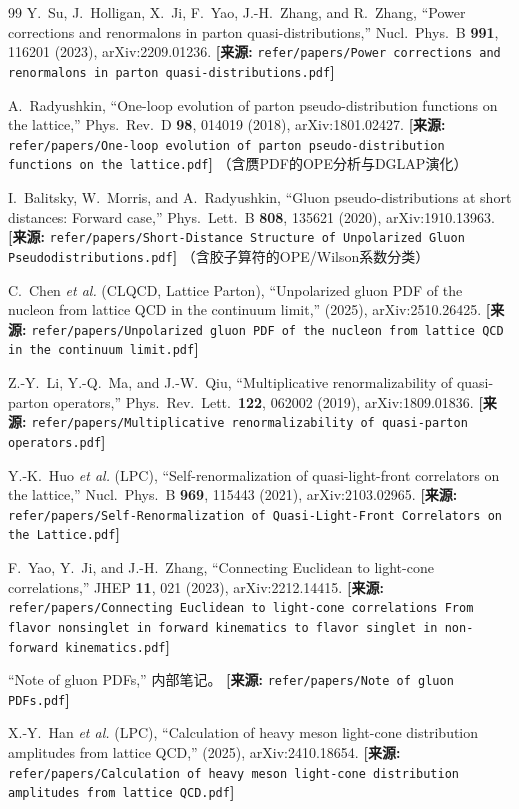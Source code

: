 \documentclass[12pt,a4paper]{ctexart}
\theoremstyle{definition}
\begin{document}
\begin{thebibliography}{99}
Y.~Su, J.~Holligan, X.~Ji, F.~Yao, J.-H.~Zhang, and R.~Zhang,
``Power corrections and renormalons in parton quasi-distributions,''
Nucl.\ Phys.\ B \textbf{991}, 116201 (2023), arXiv:2209.01236.
\quad\textbf{[来源:} \texttt{refer/papers/Power corrections and renormalons in parton quasi-distributions.pdf}\textbf{]}

A.~Radyushkin,
``One-loop evolution of parton pseudo-distribution functions on the lattice,''
Phys.\ Rev.\ D \textbf{98}, 014019 (2018), arXiv:1801.02427.
\quad\textbf{[来源:} \texttt{refer/papers/One-loop evolution of parton pseudo-distribution functions on the lattice.pdf}\textbf{]}
（含赝PDF的OPE分析与DGLAP演化）

I.~Balitsky, W.~Morris, and A.~Radyushkin,
``Gluon pseudo-distributions at short distances: Forward case,''
Phys.\ Lett.\ B \textbf{808}, 135621 (2020), arXiv:1910.13963.
\quad\textbf{[来源:} \texttt{refer/papers/Short-Distance Structure of Unpolarized Gluon Pseudodistributions.pdf}\textbf{]}
（含胶子算符的OPE/Wilson系数分类）

C.~Chen \textit{et al.} (CLQCD, Lattice Parton),
``Unpolarized gluon PDF of the nucleon from lattice QCD in the continuum limit,''
(2025), arXiv:2510.26425.
\quad\textbf{[来源:} \texttt{refer/papers/Unpolarized gluon PDF of the nucleon from lattice QCD in the continuum limit.pdf}\textbf{]}

Z.-Y.~Li, Y.-Q.~Ma, and J.-W.~Qiu,
``Multiplicative renormalizability of quasi-parton operators,''
Phys.\ Rev.\ Lett.\ \textbf{122}, 062002 (2019), arXiv:1809.01836.
\quad\textbf{[来源:} \texttt{refer/papers/Multiplicative renormalizability of quasi-parton operators.pdf}\textbf{]}

Y.-K.~Huo \textit{et al.} (LPC),
``Self-renormalization of quasi-light-front correlators on the lattice,''
Nucl.\ Phys.\ B \textbf{969}, 115443 (2021), arXiv:2103.02965.
\quad\textbf{[来源:} \texttt{refer/papers/Self-Renormalization of Quasi-Light-Front Correlators on the Lattice.pdf}\textbf{]}

F.~Yao, Y.~Ji, and J.-H.~Zhang,
``Connecting Euclidean to light-cone correlations,''
JHEP \textbf{11}, 021 (2023), arXiv:2212.14415.
\quad\textbf{[来源:} \texttt{refer/papers/Connecting Euclidean to light-cone correlations From flavor nonsinglet in forward kinematics to flavor singlet in non-forward kinematics.pdf}\textbf{]}

``Note of gluon PDFs,'' 内部笔记。
\quad\textbf{[来源:} \texttt{refer/papers/Note of gluon PDFs.pdf}\textbf{]}

X.-Y.~Han \textit{et al.} (LPC),
``Calculation of heavy meson light-cone distribution amplitudes from lattice QCD,''
(2025), arXiv:2410.18654.
\quad\textbf{[来源:} \texttt{refer/papers/Calculation of heavy meson light-cone distribution amplitudes from lattice QCD.pdf}\textbf{]}

\end{thebibliography}
\end{document}
